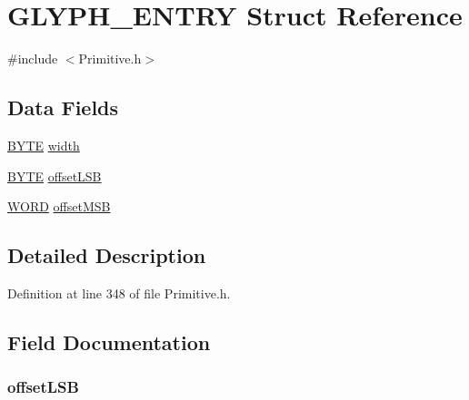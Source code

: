 \hypertarget{struct_g_l_y_p_h___e_n_t_r_y}{}\section{G\+L\+Y\+P\+H\+\_\+\+E\+N\+T\+R\+Y Struct Reference}
\label{struct_g_l_y_p_h___e_n_t_r_y}


{\ttfamily \#include $<$Primitive.\+h$>$}

\subsection*{Data Fields}
\begin{DoxyCompactItemize}
\item 
\hyperlink{_generic_type_defs_8h_a4ae1dab0fb4b072a66584546209e7d58}{B\+Y\+T\+E} \hyperlink{struct_g_l_y_p_h___e_n_t_r_y_ad471bc246135d293139a6d1615727c48}{width}
\item 
\hyperlink{_generic_type_defs_8h_a4ae1dab0fb4b072a66584546209e7d58}{B\+Y\+T\+E} \hyperlink{struct_g_l_y_p_h___e_n_t_r_y_a3803a786cd9c30cef81efbca33e1a568}{offset\+L\+S\+B}
\item 
\hyperlink{_generic_type_defs_8h_a2b0e863dadf920709ec53d9088ee7c91}{W\+O\+R\+D} \hyperlink{struct_g_l_y_p_h___e_n_t_r_y_ad770f0e3b61afda38e40b15bf56484ee}{offset\+M\+S\+B}
\end{DoxyCompactItemize}


\subsection{Detailed Description}


Definition at line 348 of file Primitive.\+h.



\subsection{Field Documentation}
\hypertarget{struct_g_l_y_p_h___e_n_t_r_y_a3803a786cd9c30cef81efbca33e1a568}{}
\subsubsection[{offset\+L\+S\+B}]{ offset\+L\+S\+B}\label{struct_g_l_y_p_h___e_n_t_r_y_a3803a786cd9c30cef81efbca33e1a568}


